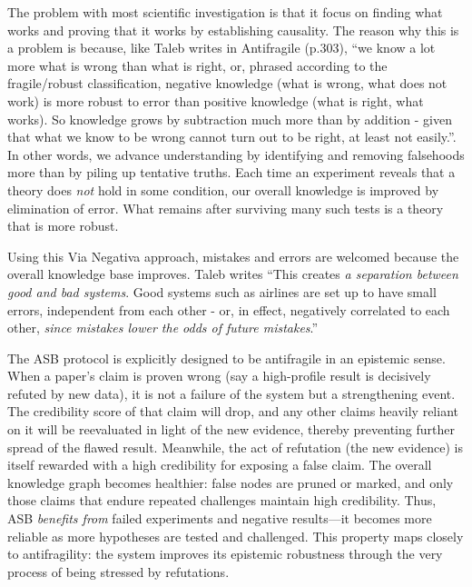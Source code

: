 \documentclass{article}
\begin{document}
The problem with most scientific investigation is that it focus on finding what works and proving that it works by establishing causality. The reason why this is a problem is because, like Taleb writes in Antifragile \cite{Taleb2012}(p.303), ``we know a lot more what is wrong than what is right, or, phrased according to the fragile/robust classification, negative knowledge (what is wrong, what does not work) is more robust to error than positive knowledge (what is right, what works). So knowledge grows by subtraction much more than by addition - given that what we know to be wrong cannot turn out to be right, at least not easily.''. In other words, we advance understanding by identifying and removing falsehoods more than by piling up tentative truths. Each time an experiment reveals that a theory does \emph{not} hold in some condition, our overall knowledge is improved by elimination of error. What remains after surviving many such tests is a theory that is more robust.

Using this Via Negativa approach, mistakes and errors are welcomed because the overall knowledge base improves. Taleb writes ``This creates \emph{a separation between good and bad systems}. Good systems such as airlines are set up to have small errors, independent from each other - or, in effect, negatively correlated to each other, \emph{since mistakes lower the odds of future mistakes}.''\cite{Taleb2012}

The ASB protocol is explicitly designed to be antifragile in an epistemic sense. When a paper's claim is proven wrong (say a high-profile result is decisively refuted by new data), it is not a failure of the system but a strengthening event. The credibility score of that claim will drop, and any other claims heavily reliant on it will be reevaluated in light of the new evidence, thereby preventing further spread of the flawed result. Meanwhile, the act of refutation (the new evidence) is itself rewarded with a high credibility for exposing a false claim. The overall knowledge graph becomes healthier: false nodes are pruned or marked, and only those claims that endure repeated challenges maintain high credibility. Thus, ASB \emph{benefits from} failed experiments and negative results---it becomes more reliable as more hypotheses are tested and challenged. This property maps closely to antifragility: the system improves its epistemic robustness through the very process of being stressed by refutations.
\end{document}
